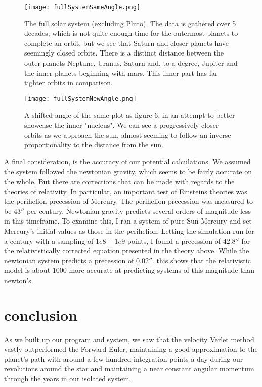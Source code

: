 \documentclass[10pt, twocolumn]{revtex4-1}
\begin{document}
\begin{figure}[hbtp]
    \texttt{[image: fullSystemSameAngle.png]}
    \caption{The full solar system (excluding Pluto). The data is gathered over 5 decades, which is not quite enough 
        time for the outermost planets to complete an orbit, but we see that Saturn and closer planets have seemingly 
        closed orbits. There is a distinct distance between the outer planets Neptune, Uranus, Saturn and, to a degree, 
        Jupiter and the inner planets beginning with mars. This inner part has far tighter orbits in comparison.} 
    \label{}
\end{figure}


\begin{figure}[hbtp]
    \texttt{[image: fullSystemNewAngle.png]}
    \caption{A shifted angle of the same plot as figure 6, in an attempt to better showcase the inner "nucleus". 
        We can see a progressively closer orbits as we approach the sun, almost seeming to follow an inverse proportionality 
        to the distance from the sun. } 
    \label{}
\end{figure}

A final consideration, is the accuracy of our potential calculations. We assumed the system followed the newtonian gravity, which seems 
to be fairly accurate on the whole. But there are corrections that can be made with regards to the theories of relativity. In particular, 
an important test of Einsteins theories was the perihelion precession of Mercury. The perihelion precession was measured to be $43''$ per century.
Newtonian gravity predicts several orders of magnitude less in this timeframe. To examine this, I ran a system of pure Sun-Mercury and set Mercury's 
initial values as those in the perihelion. Letting the simulation run for a century with a sampling of $1e8-1e9$ points, I found a precession of 
$42.8''$ for the relativistically corrected equation presented in the theory above. While the newtonian system predicts a precession of $0.02''$.
this shows that the relativistic model is about $1 000$ more accurate at predicting systems of this magnitude than newton's. 

\section{conclusion}
As we built up our program and system, we saw that the velocity Verlet method vastly outperformed the Forward Euler, maintaining a good approximation
to the planet's path with around a few hundred integration points a day during our revolutions around the star and maintaining a near constant angular
momentum through the years in our isolated system. \\
\end{document}
